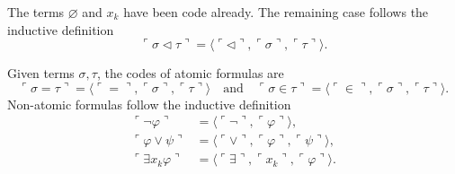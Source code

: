 \begin{definition}
    \label{def:Code.Term}
    The terms $\varnothing$ and $x_k$ have been code already. 
    The remaining case follows the inductive definition
    $$
    \ulcorner{\sigma \lhd \tau}\urcorner = 
    \langle\ulcorner{\lhd}\urcorner, \ulcorner{\sigma}\urcorner, \ulcorner{\tau}\urcorner \rangle.
    $$
\end{definition}

\begin{definition}
    \label{def:Code.Formula}
    \leanok
    Given terms $\sigma, \tau$, the codes of atomic formulas are
    $$
    \ulcorner{\sigma = \tau}\urcorner = 
    \langle\ulcorner{=}\urcorner, \ulcorner{\sigma}\urcorner, \ulcorner{\tau}\urcorner \rangle
    \quad \text{and} \quad
    \ulcorner{\sigma \in \tau}\urcorner = 
    \langle\ulcorner{\in}\urcorner, \ulcorner{\sigma}\urcorner, \ulcorner{\tau}\urcorner \rangle.
    $$
    Non-atomic formulas follow the inductive definition
    $$
    \begin{aligned}
        \ulcorner{\neg\varphi}\urcorner & = 
        \langle\ulcorner{\neg}\urcorner, \ulcorner{\varphi}\urcorner \rangle, \\
        \ulcorner{\varphi \lor \psi}\urcorner & = 
        \langle\ulcorner{\lor}\urcorner, \ulcorner{\varphi}\urcorner, 
        \ulcorner{\psi}\urcorner \rangle, \\
        \ulcorner{\exists x_k \varphi}\urcorner & = 
        \langle\ulcorner{\exists}\urcorner, \ulcorner{x_k}\urcorner, 
        \ulcorner{\varphi}\urcorner \rangle.
    \end{aligned}
    $$
\end{definition}

